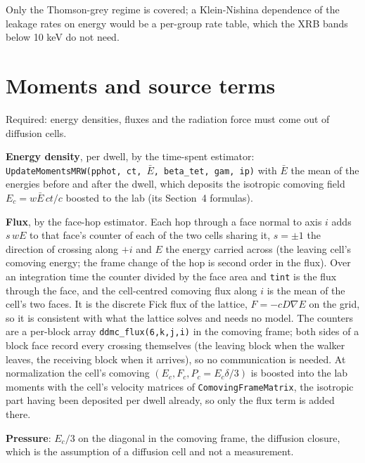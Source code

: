 \documentclass[11pt]{article}
\begin{document}
Only the Thomson-grey regime is covered; a Klein-Nishina dependence of the leakage
rates on energy would be a per-group rate table, which the XRB bands below 10 keV do
not need.

\section{Moments and source terms}
\label{sec:moments}

Required: energy densities, fluxes and the radiation force must come out of diffusion
cells.

\textbf{Energy density}, per dwell, by the time-spent estimator:
\texttt{UpdateMomentsMRW(pphot, ct, $\bar E$, beta\_tet, gam, ip)} with $\bar E$ the
mean of the energies before and after the dwell, which deposits the isotropic comoving
field $E_c = w\bar E\,ct/c$ boosted to the lab (its Section~4 formulas).

\textbf{Flux}, by the face-hop estimator.  Each hop through a face normal to axis $i$
adds $s\,wE$ to that face's counter of each of the two cells sharing it, $s=\pm1$ the
direction of crossing along $+i$ and $E$ the energy carried across (the leaving cell's
comoving energy; the frame change of the hop is second order in the flux).  Over an
integration time the counter divided by the face area and \texttt{tint} is the flux
through the face, and the cell-centred comoving flux along $i$ is the mean of the
cell's two faces.  It is the discrete Fick flux of the lattice, $F=-cD\nabla E$ on the
grid, so it is consistent with what the lattice solves and needs no model.  The
counters are a per-block array \texttt{ddmc\_flux(6,k,j,i)} in the comoving frame;
both sides of a block face record every crossing themselves (the leaving block when the
walker leaves, the receiving block when it arrives), so no communication is needed.
At normalization the cell's comoving $(E_c, F_c, P_c = E_c\delta/3)$ is boosted into
the lab moments with the cell's velocity matrices of \texttt{ComovingFrameMatrix}, the
isotropic part having been deposited per dwell already, so only the flux term is
added there.

\textbf{Pressure}: $E_c/3$ on the diagonal in the comoving frame, the diffusion
closure, which is the assumption of a diffusion cell and not a measurement.
\end{document}
